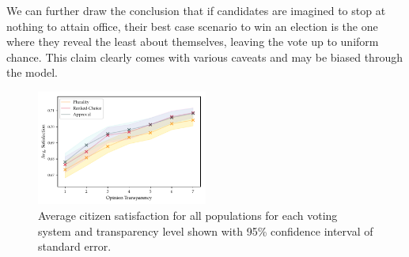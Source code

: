 We can further draw the conclusion that if candidates are imagined to stop at nothing to attain office, their best case scenario to win an election is the one where they reveal the least about themselves, leaving the vote up to uniform chance.
This claim clearly comes with various caveats and may be biased through the model.

\begin{figure}[h!]
\includegraphics[width=0.5\textwidth]{../src/figs/new/avghapp_transparency.pdf}
\caption{Average citizen satisfaction for all populations for each voting system and transparency level shown
    with 95\% confidence interval of standard error.}
    \label{fig:avghapp_by_transparency}
\end{figure}
